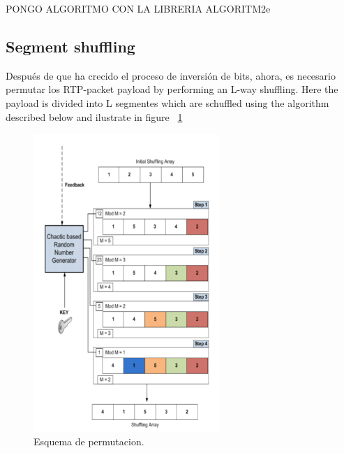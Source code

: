 PONGO ALGORITMO CON LA LIBRERIA ALGORITM2e

\subsection{Segment shuffling}

Después de que ha crecido el  proceso de inversión de bits, ahora, es necesario permutar los RTP-packet payload by performing an L-way shuffling. Here the payload is divided into L segmentes which are schuffled using the algorithm described below and ilustrate in figure ~\ref{shuffling}

\begin{figure}[H]
\centering
\includegraphics[width=7cm]{logos/per.png}
\caption{Esquema de permutacion.}
\label{shuffling}
\end{figure}



